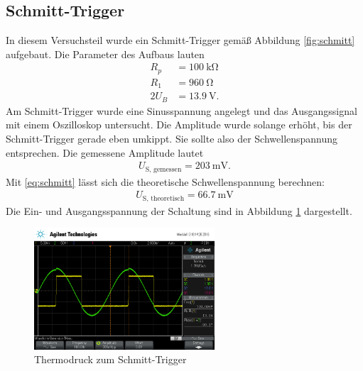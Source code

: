 \subsection{Schmitt-Trigger}
In diesem Versuchsteil wurde ein Schmitt-Trigger gemäß Abbildung \ref{fig:schmitt} aufgebaut.
Die Parameter des Aufbaus lauten
\begin{align}
	R_p &= \SI{100}{\kilo \ohm} \\
	R_1 &= \SI{960}{\ohm} \\
	2U_B &= \SI{13.9}{\volt}.
\end{align}
Am Schmitt-Trigger wurde eine Sinusspannung angelegt und das Ausgangssignal mit einem Oszilloskop untersucht.
Die Amplitude wurde solange erhöht, bis der Schmitt-Trigger gerade eben umkippt.
Sie sollte also der Schwellenspannung entsprechen.
Die gemessene Amplitude lautet
\begin{align}
	U_\text{S, gemessen} = \SI{203}{\milli \volt}.
\end{align}
Mit \eqref{eq:schmitt} lässt sich die theoretische Schwellenspannung berechnen:
\begin{align}
	U_\text{S, theoretisch} = \SI{66,7}{\milli \volt}
\end{align}
Die Ein- und Ausgangsspannung der Schaltung sind in Abbildung \ref{fig:schmittscope} dargestellt.
\begin{figure}
	\centering
	\includegraphics[width=0.6\textwidth]{img/scope_7_schmitt.png}
	\caption{Thermodruck zum Schmitt-Trigger}
	\label{fig:schmittscope}
\end{figure}

